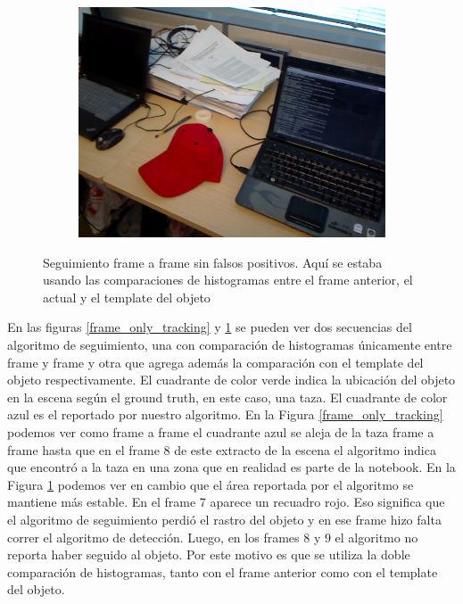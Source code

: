 \begin{figure}
\begin{subfigure}[b]{0.3\textwidth}
		\includegraphics[width=\textwidth]{img/seguimiento_frame_template/frame_template-desk_1-coffee_mug_5-frame_34.png}
	\end{subfigure}

	\caption{Seguimiento frame a frame sin falsos positivos. Aquí se estaba usando las comparaciones de histogramas entre el frame anterior, el actual y el template del objeto}
	\label{frame_template_tracking}
\end{figure}


En las figuras \ref{frame_only_tracking} y \ref{frame_template_tracking} se pueden ver dos secuencias del algoritmo de seguimiento, una con comparación de histogramas únicamente entre frame y frame y otra que agrega además la comparación con el template del objeto respectivamente. El cuadrante de color verde indica la ubicación del objeto en la escena según el ground truth, en este caso, una taza. El cuadrante de color azul es el reportado por nuestro algoritmo. En la Figura \ref{frame_only_tracking} podemos ver como frame a frame el cuadrante azul se aleja de la taza frame a frame hasta que en el frame 8 de este extracto de la escena el algoritmo indica que encontró a la taza en una zona que en realidad es parte de la notebook. En la Figura \ref{frame_template_tracking} podemos ver en cambio que el área reportada por el algoritmo se mantiene más estable. En el frame 7 aparece un recuadro rojo. Eso significa que el algoritmo de seguimiento perdió el rastro del objeto y en ese frame hizo falta correr el algoritmo de detección. Luego, en los frames 8 y 9 el algoritmo no reporta haber seguido al objeto. Por este motivo es que se utiliza la doble comparación de histogramas, tanto con el frame anterior como con el template del objeto.

